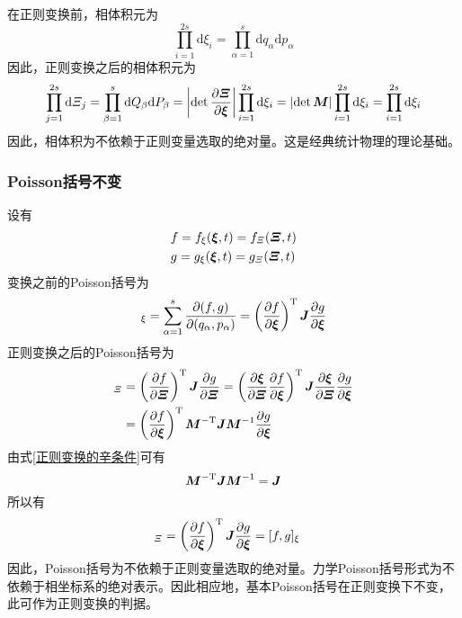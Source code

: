 在正则变换前，相体积元为
\begin{equation*}
	\prod_{i=1}^{2s} \mathrm{d} \xi_i = \prod_{\alpha=1}^s \mathrm{d} q_\alpha \mathrm{d} p_\alpha
\end{equation*}
因此，正则变换之后的相体积元为
\begin{equation*}
	\prod_{j=1}^{2s} \mathrm{d} \mathnormal{\Xi}_j = \prod_{\beta=1}^s \mathrm{d} Q_\beta \mathrm{d} P_\beta = \left|\det\frac{\partial \boldsymbol{\mathnormal{\Xi}}}{\partial \boldsymbol{\xi}}\right| \prod_{i=1}^{2s} \mathrm{d} \xi_i = \left|\det \boldsymbol{M}\right| \prod_{i=1}^{2s} \mathrm{d} \xi_i = \prod_{i=1}^{2s} \mathrm{d} \xi_i
\end{equation*}
因此，相体积为不依赖于正则变量选取的绝对量。这是经典统计物理的理论基础。

\subsubsection{Poisson括号不变}

设有
\begin{align*}
	& f = f_\xi(\boldsymbol{\xi},t) = f_{\mathnormal{\Xi}}(\boldsymbol{\mathnormal{\Xi}},t) \\
	& g = g_\xi(\boldsymbol{\xi},t) = g_{\mathnormal{\Xi}}(\boldsymbol{\mathnormal{\Xi}},t)
\end{align*}
变换之前的Poisson括号为
\begin{equation*}
	[f,g]_\xi = \sum_{\alpha=1}^s \frac{\pl (f,g)}{\pl (q_\alpha,p_\alpha)} = \left(\frac{\pl f}{\pl \mbf{\xi}}\right)^{\mathrm{T}} \mbf{J} \frac{\pl g}{\pl \mbf{\xi}}
\end{equation*}
正则变换之后的Poisson括号为
\begin{align*}
	[f,g]_{\mathnormal{\Xi}} & = \left(\frac{\pl f}{\pl \mrm{\Xi}}\right)^{\mathrm{T}} \mbf{J} \frac{\pl g}{\pl \mrm{\Xi}} = \left(\frac{\pl \mbf{\xi}}{\pl \mrm{\Xi}} \frac{\pl f}{\pl \mbf{\xi}} \right)^{\mathrm{T}} \mbf{J} \frac{\pl \mbf{\xi}}{\pl \mrm{\Xi}}  \frac{\pl g}{\pl \mbf{\xi}} \\
	& = \left(\frac{\pl f}{\pl \mbf{\xi}}\right)^{\mathrm{T}} \mbf{M}^{-\mathrm{T}} \mbf{J} \mbf{M}^{-1} \frac{\pl g}{\pl \mbf{\xi}}
\end{align*}
由式\eqref{正则变换的辛条件}可有
\begin{equation*}
	\boldsymbol{M}^{-\mathrm{T}} \boldsymbol{J} \boldsymbol{M}^{-1} = \boldsymbol{J}
\end{equation*}
所以有
\begin{align*}
	[f,g]_{\mathnormal{\Xi}} & = \left(\frac{\pl f}{\pl \mbf{\xi}}\right)^{\mathrm{T}} \mbf{J} \frac{\pl g}{\pl \mbf{\xi}} = [f,g]_\xi
\end{align*}
因此，Poisson括号为不依赖于正则变量选取的绝对量。力学Poisson括号形式为不依赖于相坐标系的绝对表示。因此相应地，基本Poisson括号在正则变换下不变，此可作为正则变换的判据。

